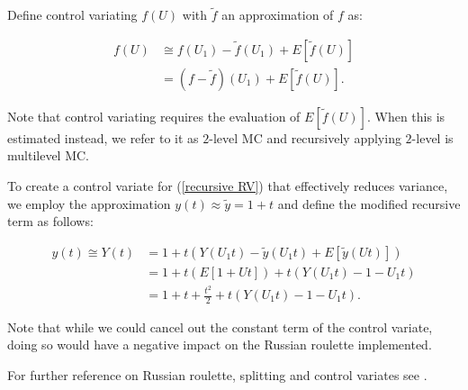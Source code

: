 \documentclass[a4paper,12pt]{article}
\begin{document}


\begin{definition} \label{CV}
  Define control variating $f(U)$ with $\tilde{f}$ an approximation of $f$ as:

  \begin{align}
    f(U) & \cong f(U_{1})-\tilde{f}(U_{1}) + E[\tilde{f}(U)] \\
         & = (f-\tilde{f})(U_{1}) + E[\tilde{f}(U)]
    .
  \end{align}

  Note that control variating requires the evaluation of
  $E[\tilde{f}(U)]$.  When this is estimated instead, we refer to it as $2$-level MC
  and recursively applying $2$-level is multilevel MC.
\end{definition}


\begin{example} \label{ex:CV}
  To create a control variate for (\ref{recursive RV}) that
  effectively reduces variance, we employ the approximation
  $y(t) \approx \tilde{y} =1+t$ and define the modified recursive term as follows:

  \begin{align}
    y(t) \cong Y(t) & = 1 + t(Y(U_{1}t) - \tilde{y}(U_{1}t) + E[\tilde{y}(Ut)])     \\
                    & = 1 + t \left( E[1 + Ut]  \right) + t(Y(U_{1}t) - 1 - U_{1}t) \\
                    & = 1 + t + \frac{t^2}{2} + t(Y(U_{1}t) - 1 - U_{1}t).
  \end{align}

  Note that while we could cancel out the constant term
  of the control variate, doing so would have a negative impact
  on the Russian roulette implemented.
\end{example}


\begin{related}[MC modification]
  For further reference on Russian roulette, splitting and control variates
  see \cite{veach_robust_1997}.
\end{related}
\end{document}
